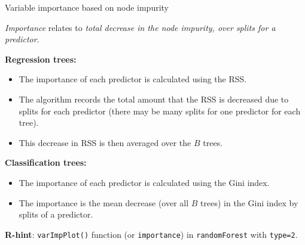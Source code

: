 \documentclass[10pt,ignorenonframetext,]{beamer}
\providecommand{\tightlist}{%
  \setlength{\itemsep}{0pt}\setlength{\parskip}{0pt}}
\begin{document}
\begin{frame}[fragile]

\begin{block}{Variable importance based on node impurity}

\vspace{1mm}

\emph{Importance} relates to \emph{total decrease in the node impurity,
over splits for a predictor}.

\vspace{4mm}

\textbf{Regression trees:}

\begin{itemize}
\tightlist
\item
  The importance of each predictor is calculated using the RSS.
\item
  The algorithm records the total amount that the RSS is decreased due
  to splits for each predictor (there may be many splits for one
  predictor for each tree).
\item
  This decrease in RSS is then averaged over the \(B\) trees.
\end{itemize}

\vspace{2mm}

\textbf{Classification trees:}

\begin{itemize}
\tightlist
\item
  The importance of each predictor is calculated using the Gini index.
\item
  The importance is the mean decrease (over all \(B\) trees) in the Gini
  index by splits of a predictor.
\end{itemize}

\vspace{3mm}

\textbf{R-hint}: \texttt{varImpPlot()} function (or \texttt{importance})
in \texttt{randomForest} with \texttt{type=2}.

\end{block}

\end{frame}
\end{document}

